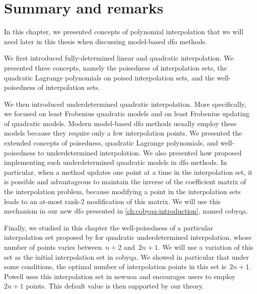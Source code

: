 \section{Summary and remarks}

In this chapter, we presented concepts of polynomial interpolation that we will need later in this thesis when discussing model-based \gls{dfo} methods.

We first introduced fully-determined linear and quadratic interpolation.
We presented three concepts, namely the poisedness of interpolation sets, the quadratic Lagrange polynomials on poised interpolation sets, and the well-poisedness of interpolation sets.

We then introduced underdetermined quadratic interpolation.
More specifically, we focused on least Frobenius quadratic models and on least Frobenius updating of quadratic models.
Modern model-based \gls{dfo} methods usually employ these models because they require only a few interpolation points.
We presented the extended concepts of poisedness, quadratic Lagrange polynomials, and well-poisedness to underdetermined interpolation.
We also presented how \citeauthor{Powell_2004b} proposed implementing such underdetermined quadratic models in \gls{dfo} methods.
In particular, when a method updates one point at a time in the interpolation set, it is possible and advantageous to maintain the inverse of the coefficient matrix of the interpolation problem, because modifying a point in the interpolation sets leads to an at-most rank-$2$ modification of this matrix.
We will use this mechanism in our new \gls{dfo} presented in \cref{ch:cobyqa-introduction}, named \gls{cobyqa}.

Finally, we studied in this chapter the well-poisedness of a particular interpolation set proposed by \citeauthor{Powell_2006} for quadratic underdetermined interpolation, whose number of points varies between~$n + 2$ and~$2n + 1$.
We will use a variation of this set as the initial interpolation set in \gls{cobyqa}.
We showed in particular that under some conditions, the optimal number of interpolation points in this set is~$2n + 1$.
Powell uses this interpolation set in \gls{newuoa} and encourages users to employ~$2n + 1$ points.
This default value is then supported by our theory.
